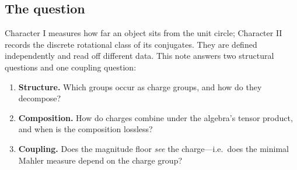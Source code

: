 \documentclass[11pt]{article}
\theoremstyle{definition}
\theoremstyle{remark}
\begin{document}
\subsection{The question}
Character I measures how far an object sits from the unit circle; Character II records the
discrete rotational class of its conjugates. They are defined independently and read off
different data. This note answers two structural questions and one coupling question:
\begin{enumerate}[label=(\roman*),nosep]
  \item \textbf{Structure.} Which groups occur as charge groups, and how do they decompose?
  \item \textbf{Composition.} How do charges combine under the algebra's tensor product, and
        when is the composition lossless?
  \item \textbf{Coupling.} Does the magnitude floor \emph{see} the charge---i.e.\ does the
        minimal Mahler measure depend on the charge group?
\end{enumerate}
\end{document}
